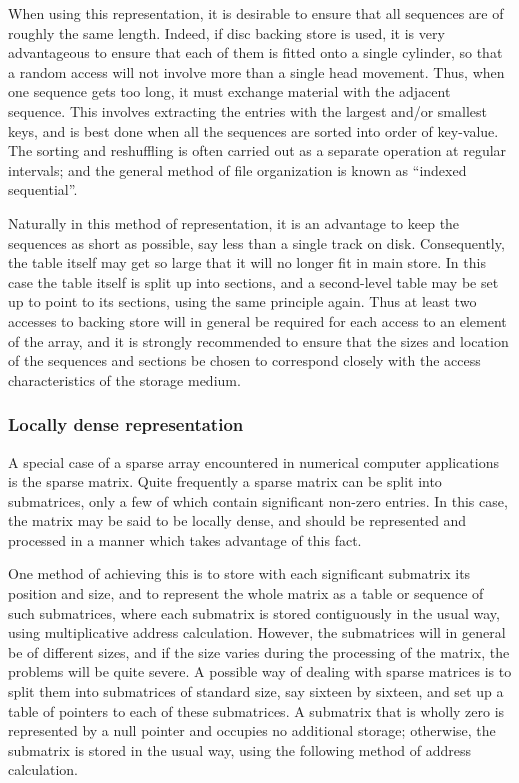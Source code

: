 When using this representation, it is desirable to ensure that all sequences are of roughly the same length. Indeed, if disc backing store is used, it is very advantageous to ensure that each of them is fitted onto a single cylinder, so that a random access will not involve more than a single head movement. Thus, when one sequence gets too long, it must exchange material with the adjacent sequence. This involves extracting the entries with the largest and/or smallest keys, and is best done when all the sequences are sorted into order of key-value. The sorting and reshuffling is often carried out as a separate operation at regular intervals; and the general method of file organization is known as ``indexed sequential''.

Naturally in this method of representation, it is an advantage to keep the sequences as short as possible, say less than a single track on disk. Consequently, the table itself may get so large that it will no longer fit in main store. In this case the table itself is split up into sections, and a second-level table may be set up to point to its sections, using the same principle again. Thus at least two accesses to backing store will in general be required for each access to an element of the array, and it is strongly recommended to ensure that the sizes and location of the sequences and sections be chosen to correspond closely with the access characteristics of the storage medium.

\subsubsection{Locally dense representation}

A special case of a sparse array encountered in numerical computer applications is the sparse matrix. Quite frequently a sparse matrix can be split into submatrices, only a few of which contain significant non-zero entries. In this case, the matrix may be said to be locally dense, and should be represented and processed in a manner which takes advantage of this fact.

One method of achieving this is to store with each significant submatrix its position and size, and to represent the whole matrix as a table or sequence of such submatrices, where each submatrix is stored contiguously in the usual way, using multiplicative address calculation. However, the submatrices will in general be of different sizes, and if the size varies during the processing of the matrix, the problems will be quite severe. A possible way of dealing with sparse matrices is to split them into submatrices of standard size, say sixteen by sixteen, and set up a table of pointers to each of these submatrices. A submatrix that is wholly zero is represented by a null pointer and occupies no additional storage; otherwise, the submatrix is stored in the usual way, using the following method of address calculation.

